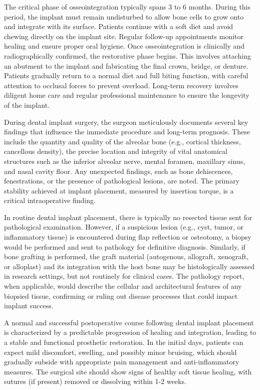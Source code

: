 The critical phase of osseointegration typically spans 3 to 6 months. During this period, the implant must remain undisturbed to allow bone cells to grow onto and integrate with its surface. Patients continue with a soft diet and avoid chewing directly on the implant site. Regular follow-up appointments monitor healing and ensure proper oral hygiene. Once osseointegration is clinically and radiographically confirmed, the restorative phase begins. This involves attaching an abutment to the implant and fabricating the final crown, bridge, or denture. Patients gradually return to a normal diet and full biting function, with careful attention to occlusal forces to prevent overload. Long-term recovery involves diligent home care and regular professional maintenance to ensure the longevity of the implant.

During dental implant surgery, the surgeon meticulously documents several key findings that influence the immediate procedure and long-term prognosis. These include the quantity and quality of the alveolar bone (e.g., cortical thickness, cancellous density), the precise location and integrity of vital anatomical structures such as the inferior alveolar nerve, mental foramen, maxillary sinus, and nasal cavity floor. Any unexpected findings, such as bone dehiscences, fenestrations, or the presence of pathological lesions, are noted. The primary stability achieved at implant placement, measured by insertion torque, is a critical intraoperative finding.

In routine dental implant placement, there is typically no resected tissue sent for pathological examination. However, if a suspicious lesion (e.g., cyst, tumor, or inflammatory tissue) is encountered during flap reflection or osteotomy, a biopsy would be performed and sent to pathology for definitive diagnosis. Similarly, if bone grafting is performed, the graft material (autogenous, allograft, xenograft, or alloplast) and its integration with the host bone may be histologically assessed in research settings, but not routinely for clinical cases. The pathology report, when applicable, would describe the cellular and architectural features of any biopsied tissue, confirming or ruling out disease processes that could impact implant success.

A normal and successful postoperative course following dental implant placement is characterized by a predictable progression of healing and integration, leading to a stable and functional prosthetic restoration. In the initial days, patients can expect mild discomfort, swelling, and possibly minor bruising, which should gradually subside with appropriate pain management and anti-inflammatory measures. The surgical site should show signs of healthy soft tissue healing, with sutures (if present) removed or dissolving within 1-2 weeks.


